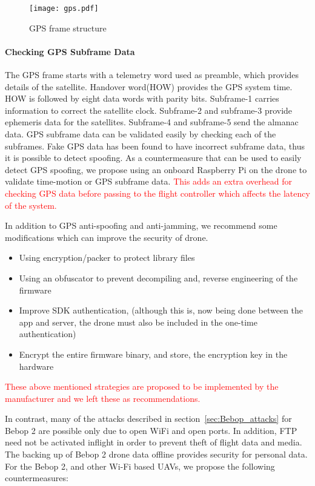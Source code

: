 \documentclass[conference]{IEEEtran}
\begin{document}
\begin{figure}[h!]
	\centering
	\texttt{[image: gps.pdf]}
	\label{fig:gps_frame}
	\caption{GPS frame structure}
\end{figure}

\paragraph*{Checking GPS Subframe Data}
The GPS frame starts with a telemetry word used as preamble, which provides details of the satellite.
Handover word(HOW) provides the GPS system time. HOW is followed by eight data words with parity bits.
Subframe-1 carries information to correct the satellite clock. Subframe-2 and subframe-3 provide ephemeris data for the satellites. 
Subframe-4 and subframe-5 send the almanac data. 
GPS subframe data can be validated easily by checking each of the subframes.
Fake GPS data has been found to have incorrect subframe data, 
thus it is possible to detect spoofing. 
As a countermeasure that can be used to easily detect GPS spoofing, we propose using an onboard Raspberry Pi on the drone to validate time-motion or GPS subframe data. \textcolor{red}{This adds an extra overhead for checking GPS data before passing to the flight controller which affects the latency of the system.}

In addition to GPS anti-spoofing and anti-jamming, we recommend some modifications which can improve the security of drone. 
\begin{itemize}
	\item Using encryption/packer to protect library files
	\item Using an obfuscator to prevent decompiling and, reverse engineering of the firmware
	\item Improve SDK authentication, (although this is, now being done between the app and server, the drone must also be included in the one-time authentication)
	\item Encrypt the entire firmware binary, and store, the encryption key in the hardware
\end{itemize}
\textcolor{red}{These above mentioned strategies are proposed to be implemented by the manufacturer and we left these as recommendations.}

In contrast, many of the attacks described in section~\ref{sec:Bebop_attacks} for Bebop 2 are possible only due to open WiFi and open ports. In addition, FTP need not be activated inflight in order to prevent theft of flight data and media. 
The backing up of Bebop 2 drone data offline provides security for personal data.
For the Bebop 2, and other Wi-Fi based UAVs, we propose the following countermeasures:
\end{document}
